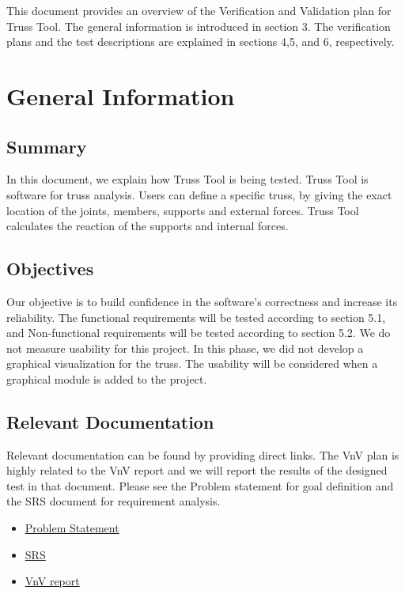 \documentclass[12pt, titlepage]{article}
\begin{document}
\newpage
This document provides an overview of the Verification and Validation
 plan for Truss Tool. The general information is introduced in section 3. The verification plans and the test descriptions are explained in sections 4,5, and 6, respectively.
\section{General Information}


\subsection{Summary}

In this document, we explain how Truss Tool is being tested. Truss Tool is software for truss analysis. Users can define a specific truss, by giving the exact location of the joints, members, supports and external forces.  Truss Tool calculates the reaction of the supports and internal forces. 

\subsection{Objectives}

Our objective is to build confidence in the software's correctness and increase its reliability. The functional requirements will be tested according to section 5.1, and Non-functional requirements will be tested according to section 5.2. We do not measure usability for this project. In this phase, we did not develop a graphical visualization for the truss. The usability will be considered when a graphical module is added to the project.

\subsection{Relevant Documentation}
Relevant documentation can be found by providing direct links. The VnV plan is highly related to the VnV report and we will report the results of the designed test in that document. Please see the Problem statement for goal definition and the SRS document for requirement analysis.
\begin{itemize}
	\item 
	\href{https://github.com/Maryamvalian/project741/blob/main/docs/ProblemStatementAndGoals/ProblemStatement.pdf}{Problem
	 Statement}
	\item 
	\href{https://github.com/Maryamvalian/project741/blob/main/docs/SRS/SRS.pdf}{SRS} 
	\item \href{https://github.com/Maryamvalian/project741/blob/main/docs/VnVReport/VnVReport.pdf}{VnV
	 report}
\end{itemize}
\end{document}
